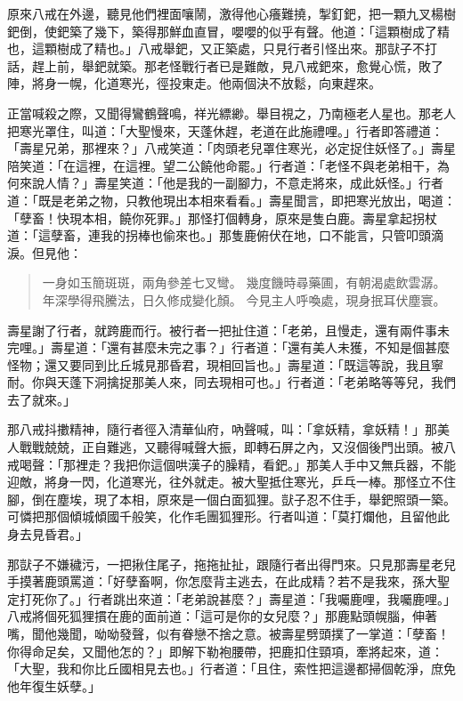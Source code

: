 原來八戒在外邊，聽見他們裡面嚷鬧，激得他心癢難撓，掣釘鈀，把一顆九叉楊樹鈀倒，使鈀築了幾下，築得那鮮血直冒，嚶嚶的似乎有聲。他道：「這顆樹成了精也，這顆樹成了精也。」八戒舉鈀，又正築處，只見行者引怪出來。那獃子不打話，趕上前，舉鈀就築。那老怪戰行者已是難敵，見八戒鈀來，愈覺心慌，敗了陣，將身一幌，化道寒光，徑投東走。他兩個決不放鬆，向東趕來。

正當喊殺之際，又聞得鸞鶴聲鳴，祥光縹緲。舉目視之，乃南極老人星也。那老人把寒光罩住，叫道：「大聖慢來，天蓬休趕，老道在此施禮哩。」行者即答禮道：「壽星兄弟，那裡來？」八戒笑道：「肉頭老兒罩住寒光，必定捉住妖怪了。」壽星陪笑道：「在這裡，在這裡。望二公饒他命罷。」行者道：「老怪不與老弟相干，為何來說人情？」壽星笑道：「他是我的一副腳力，不意走將來，成此妖怪。」行者道：「既是老弟之物，只教他現出本相來看看。」壽星聞言，即把寒光放出，喝道：「孽畜！快現本相，饒你死罪。」那怪打個轉身，原來是隻白鹿。壽星拿起拐杖道：「這孽畜，連我的拐棒也偷來也。」那隻鹿俯伏在地，口不能言，只管叩頭滴淚。但見他：
\begin{quote}
一身如玉簡斑斑，兩角參差七叉彎。
幾度饑時尋藥圃，有朝渴處飲雲潺。
年深學得飛騰法，日久修成變化顏。
今見主人呼喚處，現身抿耳伏塵寰。
\end{quote}

壽星謝了行者，就跨鹿而行。被行者一把扯住道：「老弟，且慢走，還有兩件事未完哩。」壽星道：「還有甚麼未完之事？」行者道：「還有美人未獲，不知是個甚麼怪物；還又要同到比丘城見那昏君，現相回旨也。」壽星道：「既這等說，我且寧耐。你與天蓬下洞擒捉那美人來，同去現相可也。」行者道：「老弟略等等兒，我們去了就來。」

那八戒抖擻精神，隨行者徑入清華仙府，吶聲喊，叫：「拿妖精，拿妖精！」那美人戰戰兢兢，正自難逃，又聽得喊聲大振，即轉石屏之內，又沒個後門出頭。被八戒喝聲：「那裡走？我把你這個哄漢子的臊精，看鈀。」那美人手中又無兵器，不能迎敵，將身一閃，化道寒光，往外就走。被大聖抵住寒光，乒乓一棒。那怪立不住腳，倒在塵埃，現了本相，原來是一個白面狐狸。獃子忍不住手，舉鈀照頭一築。可憐把那個傾城傾國千般笑，化作毛團狐狸形。行者叫道：「莫打爛他，且留他此身去見昏君。」

那獃子不嫌穢污，一把揪住尾子，拖拖扯扯，跟隨行者出得門來。只見那壽星老兒手摸著鹿頭罵道：「好孽畜啊，你怎麼背主逃去，在此成精？若不是我來，孫大聖定打死你了。」行者跳出來道：「老弟說甚麼？」壽星道：「我囑鹿哩，我囑鹿哩。」八戒將個死狐狸摜在鹿的面前道：「這可是你的女兒麼？」那鹿點頭幌腦，伸著嘴，聞他幾聞，呦呦發聲，似有眷戀不捨之意。被壽星劈頭撲了一掌道：「孽畜！你得命足矣，又聞他怎的？」即解下勒袍腰帶，把鹿扣住頸項，牽將起來，道：「大聖，我和你比丘國相見去也。」行者道：「且住，索性把這邊都掃個乾淨，庶免他年復生妖孽。」

